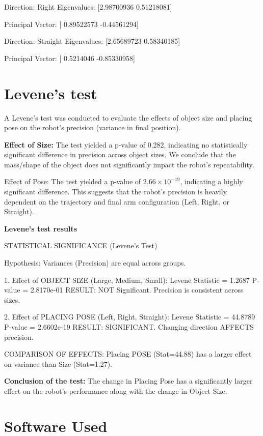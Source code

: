 Direction: Right
  Eigenvalues: [2.98700936 0.51218081]

  
  Principal Vector: [ 0.89522573 -0.44561294]

Direction: Straight
  Eigenvalues: [2.65689723 0.58340185]

  
  Principal Vector: [ 0.5214046  -0.85330958]

\section{Levene’s test}

A Levene’s test was conducted to evaluate the effects of object size and placing pose on the robot's precision (variance in final position).

\textbf{Effect of Size:} The test yielded a p-value of 0.282, indicating no statistically significant difference in precision across object sizes. We conclude that the mass/shape of the object does not significantly impact the robot's repeatability.

Effect of Pose: The test yielded a p-value of $2.66 \times 10^{-19}$, indicating a highly significant difference. This suggests that the robot's precision is heavily dependent on the trajectory and final arm configuration (Left, Right, or Straight).



\textbf{Levene's test results}



 STATISTICAL SIGNIFICANCE (Levene's Test)

Hypothesis: Variances (Precision) are equal across groups.

1. Effect of OBJECT SIZE (Large, Medium, Small):
   Levene Statistic = 1.2687
   P-value          = 2.8170e-01
    RESULT: NOT Significant. Precision is consistent across sizes.

2. Effect of PLACING POSE (Left, Right, Straight):
   Levene Statistic = 44.8789
   P-value          = 2.6602e-19
    RESULT: SIGNIFICANT. Changing direction AFFECTS precision.

COMPARISON OF EFFECTS:
Placing POSE (Stat=44.88) has a larger effect on variance than Size (Stat=1.27).



\textbf{Conclusion of the test:} The change in Placing Pose has a significantly larger effect on the robot's performance along with the change in Object Size.

\section{Software Used}

